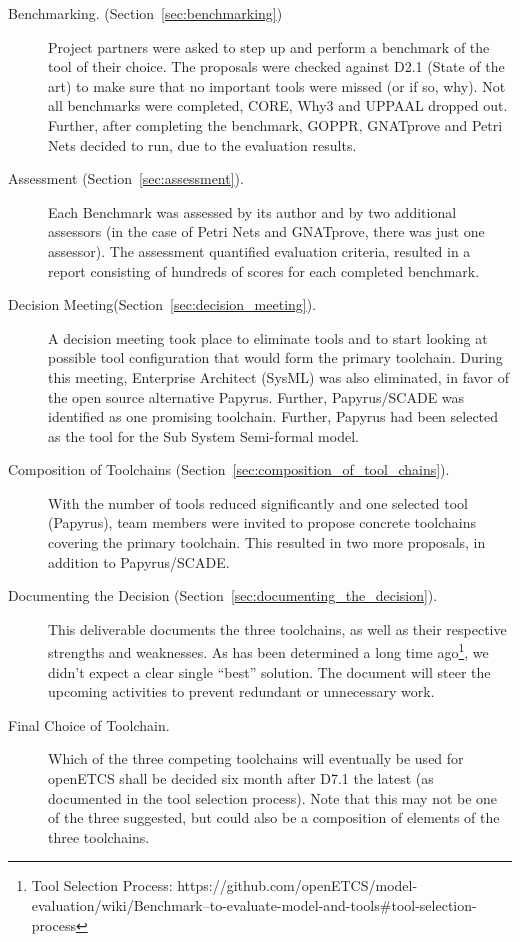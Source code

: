 \begin{description}

\item[Benchmarking. (Section~\ref{sec:benchmarking})] Project partners were asked to step up and perform a benchmark of the tool of their choice.  The proposals were checked against D2.1 (State of the art) to make sure that no important tools were missed (or if so, why).  Not all benchmarks were completed, CORE, Why3 and UPPAAL dropped out.  Further, after completing the benchmark, GOPPR, GNATprove and Petri Nets decided to run, due to the evaluation results.

\item[Assessment (Section~\ref{sec:assessment}).] Each Benchmark was assessed by its author and by two additional assessors (in the case of Petri Nets and GNATprove, there was just one assessor).  The assessment quantified evaluation criteria, resulted in a report consisting of hundreds of scores for each completed benchmark.

\item[Decision Meeting(Section~\ref{sec:decision_meeting}).] A decision meeting took place to eliminate tools and to start looking at possible tool configuration that would form the primary toolchain.  During this meeting, Enterprise Architect (SysML) was also eliminated, in favor of the open source alternative Papyrus.  Further, Papyrus/SCADE was identified as one promising toolchain.  Further, Papyrus had been selected as the tool for the Sub System Semi-formal model.

\item[Composition of Toolchains (Section~\ref{sec:composition_of_tool_chains}).] With the number of tools reduced significantly and one selected tool (Papyrus), team members were invited to propose concrete toolchains covering the primary toolchain.  This resulted in two more proposals, in addition to Papyrus/SCADE.

\item[Documenting the Decision (Section~\ref{sec:documenting_the_decision}).] This deliverable documents the three toolchains, as well as their respective strengths and weaknesses.  As has been determined a long time ago\footnote{Tool Selection Process: https://github.com/openETCS/model-evaluation/wiki/Benchmark--to-evaluate-model-and-tools\#tool-selection-process}, we didn't expect a clear single ``best'' solution.  The document will steer the upcoming activities to prevent redundant or unnecessary work.

\item[Final Choice of Toolchain.] Which of the three competing toolchains will eventually be used for openETCS shall be decided six month after D7.1 the latest (as documented in the tool selection process).  Note that this may not be one of the three suggested, but could also be a composition of elements of the three toolchains.

\end{description}

